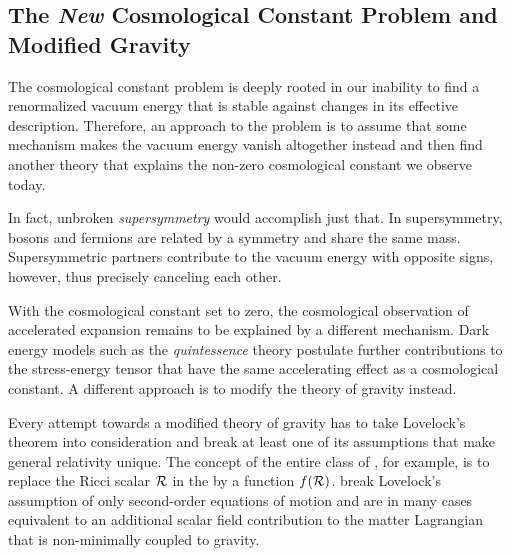 \documentclass[parskip=half]{scrreprt}
\begin{document}

\subsection{The \emph{New} Cosmological Constant Problem and Modified Gravity}\label{sec:cc_problem_new}

The cosmological constant problem is deeply rooted in our inability to find a renormalized vacuum energy that is stable against changes in its effective description. Therefore, an approach to the problem is to assume that some mechanism makes the vacuum energy vanish altogether instead and then find another theory that explains the non-zero cosmological constant we observe today.

In fact, unbroken \emph{supersymmetry} would accomplish just that. In supersymmetry, bosons and fermions are related by a symmetry and share the same mass. Supersymmetric partners contribute to the vacuum energy with opposite signs, however, thus precisely canceling each other.

With the cosmological constant set to zero, the cosmological observation of accelerated expansion  remains to be explained by a different mechanism. Dark energy models such as the \emph{quintessence} theory  postulate further contributions to the stress-energy tensor that have the same accelerating effect as a cosmological constant. A different approach is to modify the theory of gravity instead.

Every attempt towards a modified theory of gravity has to take Lovelock's theorem into consideration and break at least one of its assumptions that make general relativity unique. The concept of the entire class of \emph{}, for example, is to replace the Ricci scalar \(\mathcal{R}\) in the  by a function \(f(\mathcal{R})\).
 break Lovelock's assumption of only second-order equations of motion and are in many cases equivalent to an additional scalar field contribution to the matter Lagrangian that is non-minimally coupled to gravity. 
\end{document}
